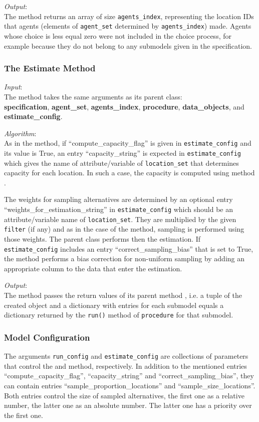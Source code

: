 {\it Output}:\\[1mm]
The method returns an array of size \verb|agents_index|,
representing the location IDs that agents (elements of
\verb|agent_set| determined by \verb|agents_index|) made. Agents
whose choice is less equal zero were not included in the choice
process, for example because they do not belong to any submodels
given in the specification.


\subsubsection{The Estimate Method}
%
{\it Input}:~\\[1mm]
The  method takes the same arguments as its parent class:\\
{\bf specification}, {\bf agent_set}, {\bf agents_index}, {\bf procedure},
{\bf data_objects}, and {\bf estimate_config}.

{\it Algorithm}:\\[1mm]
As in the  method, if ``compute_capacity_flag'' is given in
\verb|estimate_config| and its value is True, an entry ``capacity_string'' is
expected in \verb|estimate_config| which gives the name of attribute/variable
of \verb|location_set| that determines capacity for each location. In such a
case, the capacity is computed using method
.

The weights for sampling alternatives are determined by an optional entry
``weights_for_estimation_string'' in \verb|estimate_config| which should be an
attribute/variable name of \verb|location_set|. They are multiplied by the
given \verb|filter| (if any) and as in the case of the  method,
sampling is performed using those weights. The parent class performs then the
estimation. If \verb|estimate_config| includes an entry
``correct_sampling_bias'' that is set to True, the method performs a bias
correction for non-uniform sampling by adding an appropriate column to the
data that enter the estimation.

{\it Output}:\\[1mm]
The method passes the return values of its parent method ,
i.e. a tuple of the created  object and a
dictionary with entries for each submodel equals a dictionary returned by the
\verb|run()| method of \verb|procedure| for that submodel.

%
\subsubsection{Model Configuration}
\modelsindex
%
The arguments \verb|run_config| and \verb|estimate_config| are collections of
parameters that control the  and  method,
respectively. In addition to the mentioned entries ``compute_capacity_flag'',
``capacity_string'' and ``correct_sampling_bias'', they can contain entries
``sample_proportion_locations'' and ``sample_size_locations''. Both entries
control the size of sampled alternatives, the first one as a relative number,
the latter one as an absolute number. The latter one has a priority over the
first one.


